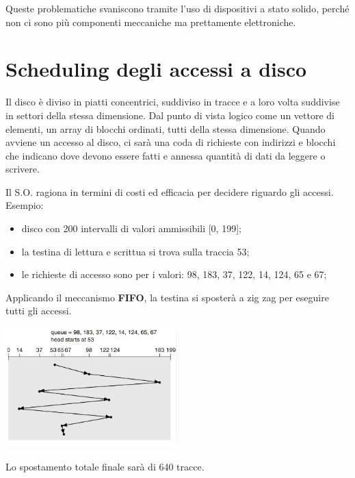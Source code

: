 \documentclass[a4paper, 12pt]{book}
\begin{document}
Queste problematiche svaniscono tramite l'uso di dispositivi
a stato solido, perché non ci sono più componenti meccaniche 
ma prettamente elettroniche.

\section{Scheduling degli accessi a disco}

Il disco è diviso in piatti concentrici, suddiviso in 
tracce e a loro volta suddivise in settori della stessa 
dimensione. Dal punto di vista logico come un vettore di 
elementi, un array di blocchi ordinati, tutti della stessa 
dimensione. Quando avviene un accesso al disco, ci sarà una 
coda di richieste con indirizzi e blocchi che indicano dove 
devono essere fatti e annessa quantità di dati da leggere 
o scrivere. 

Il S.O. ragiona in termini di costi ed efficacia per decidere
riguardo gli accessi. Esempio:
\begin{itemize}
    \item disco con 200 intervalli di valori ammissibili [0, 199];
    \item la testina di lettura e scrittua si trova sulla traccia 53;
    \item le richieste di accesso sono per i valori: 98, 183, 37, 122, 14, 124, 65 e 67;
\end{itemize}
Applicando il meccanismo \textbf{FIFO}, la testina si sposterà a 
zig zag per eseguire tutti gli accessi.
\begin{center}
    \includegraphics[width=0.5\textwidth]{zigzag.png}
\end{center}
Lo spostamento totale finale sarà di 640 tracce.
\end{document}
